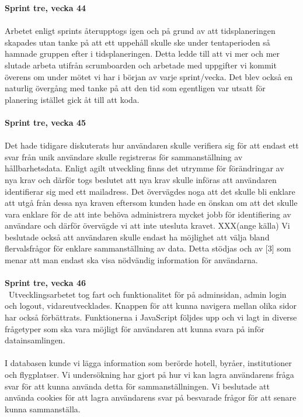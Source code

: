\documentclass[12pt]{article}
\begin{document}
\textbf{Sprint tre, vecka 44}\\\\
Arbetet enligt sprints återupptogs igen och på grund av att tidsplaneringen skapades utan tanke på att ett uppehåll skulle ske under tentaperioden så hamnade gruppen efter i tidsplaneringen. Detta ledde till att vi mer och mer slutade arbeta utifrån scrumboarden och arbetade med uppgifter vi kommit överens om under mötet vi har i början av varje sprint/vecka. Det blev också en naturlig övergång med tanke på att den tid som egentligen var utsatt för planering istället gick åt till att koda. \\\\
\textbf{Sprint tre, vecka 45} \\\\
Det hade tidigare diskuterats hur användaren skulle verifiera sig för att endast ett svar från unik användare skulle registreras för sammanställning av hållbarhetsdata. Enligt agilt utveckling finns det utrymme för förändringar av nya krav och därför togs beslutet att nya krav skulle införas att användaren identifierar sig med ett mailadress. Det övervägdes noga att det skulle bli enklare att utgå från dessa nya kraven eftersom kunden hade en önskan om att det skulle vara enklare för de att inte behöva administrera mycket jobb för identifiering av användare och därför övervägde vi att inte utesluta kravet. XXX(ange källa)
Vi beslutade också att användaren skulle endast ha möjlighet att välja bland flervalsfrågor för enklare sammanställning av data. Detta stödjas och av [3] som menar att man endast ska visa nödvändig information för användarna.\\\\
\textbf{Sprint tre, vecka 46} \\\
Utvecklingsarbetet tog fart och funktionalitet för på adminsidan, admin login och logout,  vidareutvecklades. Knappen för att kunna navigera mellan olika sidor har också förbättrats. Funktionerna i JavaScript följdes upp och vi lagt in diverse frågetyper som ska vara möjligt för användaren att kunna svara på inför datainsamlingen.\\\\
I databasen kunde vi lägga information som berörde hotell, byråer, institutioner och flygplatser. Vi undersökning har gjort på hur vi kan lagra användarens fråga svar för att kunna använda detta för sammanställningen. Vi beslutade att använda cookies för att lagra användarens svar på besvarade frågor för att senare kunna sammanställa.\\\\
\end{document}
